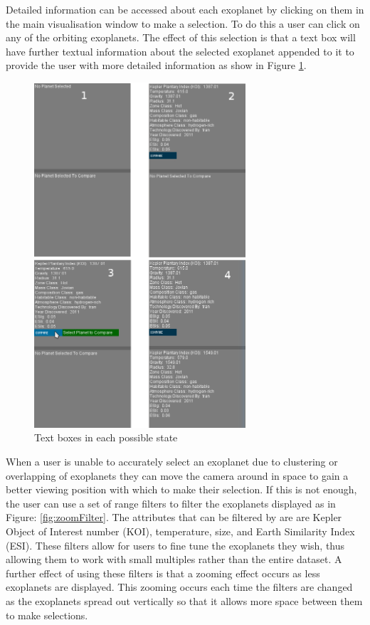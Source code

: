 Detailed information can be accessed about each exoplanet by clicking on them in
the main visualisation window to
make a selection. To do this a user can click on any of the orbiting exoplanets.
The effect of this selection is that a text box will have further textual
information about the selected exoplanet appended to it to provide the user with
more detailed information as show in Figure \ref{fig:textBoxes}. 
\begin{figure}[H]
  \centering
      \includegraphics[width=0.7\textwidth]{images/textBoxes.jpg}
  \caption{Text boxes in each possible state}
  \label{fig:textBoxes}
\end{figure}
When a user is unable to accurately select an
exoplanet due to clustering or
overlapping of exoplanets they can move the camera around in space to gain a
better viewing position with which to make their selection. If this is not
enough, the user can use a set of range filters to filter the exoplanets
displayed as in Figure: \ref{fig:zoomFilter}. The attributes that can be
filtered by are are Kepler Object of Interest number (KOI),
temperature, size, and Earth Similarity Index (ESI). These filters allow for
users to fine tune the exoplanets they wish, thus allowing them to work
with small multiples rather than the entire dataset. A further effect of using
these filters is that a zooming effect occurs as less exoplanets are displayed.
This zooming occurs each time the filters are changed as the exoplanets spread
out vertically so that it allows more space between them to make selections.

